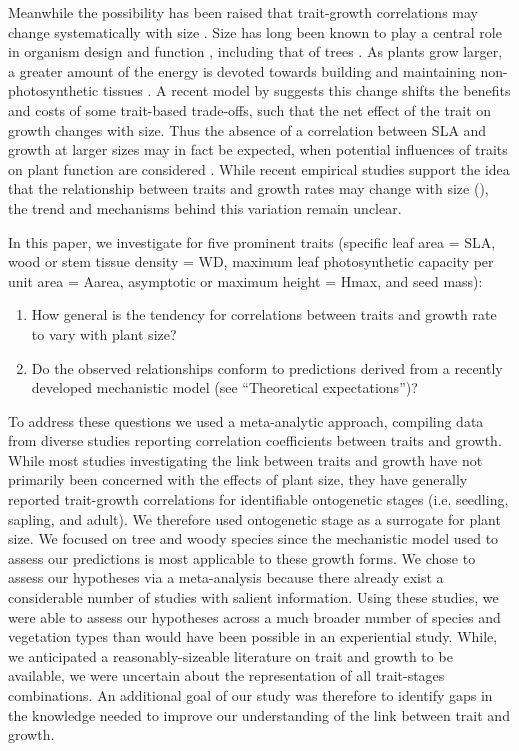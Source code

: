 \documentclass[a4paper,11pt]{article}
\begin{document}
Meanwhile the possibility has been raised that trait-growth correlations may change systematically with size \citep{King-1999, Falster:2011ii, Ruger:2012jv, Iida:2014ep, Iida:2014hq}. Size has long been known to play a central role in organism design and function \citep{Vogel:1988ux, Vogel:2003wb}, including that of trees \citep{Farnsworth:1995im, Givnish:1995ta, King-2011}. As plants grow larger, a greater amount of the energy is devoted towards building and maintaining non-photosynthetic tissues \citep{Givnish:1995ta,King-2011}. A recent model by \citet{Falster:2011ii} suggests this change shifts the benefits and costs of some trait-based trade-offs, such that the net effect of the trait on growth changes with size. Thus the absence of a correlation between SLA and growth at larger sizes may in fact be expected, when potential influences of traits on plant function are considered \citep{Falster:2011ii}. While recent empirical studies support the idea that the relationship between traits and growth rates may change with size (\citealt{Iida:2014ep, Iida:2014hq}), the trend and mechanisms behind this variation remain unclear.

In this paper, we investigate for five prominent traits (specific leaf area = SLA, wood or stem tissue density = WD, maximum leaf photosynthetic capacity per unit area = Aarea, asymptotic or maximum height = Hmax, and seed mass):
\begin{enumerate}
  \item How general is the tendency for correlations between traits and growth rate to vary with plant size?
  \item Do the observed relationships conform to predictions derived from a recently developed mechanistic model \citep{Falster:2011ii} (see ``Theoretical expectations'')?
\end{enumerate}
To address these questions we used a meta-analytic approach, compiling data from diverse studies reporting correlation coefficients between traits and growth. While most studies investigating the link between traits and growth have not primarily been concerned with the effects of plant size, they have generally reported trait-growth correlations for identifiable ontogenetic stages (i.e. seedling, sapling, and adult). We therefore used ontogenetic stage as a surrogate for plant size. We focused on tree and woody species since the mechanistic model used to assess our predictions is most applicable to these growth forms.
We chose to assess our hypotheses via a meta-analysis because there already exist a considerable number of studies with salient information. Using these studies, we were able to assess our hypotheses across a much broader number of species and vegetation types than would have been possible in an experiential study. While, we anticipated a reasonably-sizeable literature on trait and growth to be available, we were uncertain about the representation of all trait-stages combinations. An additional goal of our study was therefore to identify gaps in the knowledge needed to improve our understanding of the link between trait and growth.
\end{document}
